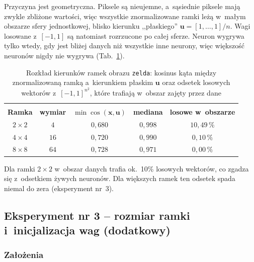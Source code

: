\documentclass[12pt]{article}
\begin{document}
Przyczyna jest geometryczna. Piksele są nieujemne, a~sąsiednie piksele mają zwykle zbliżone wartości,
więc wszystkie znormalizowane ramki leżą w~małym obszarze sfery jednostkowej, blisko kierunku
,,płaskiego'' $\mathbf{u}=[1,\dots,1]/n$. Wagi losowane z~$[-1,1]$ są natomiast rozrzucone po całej
sferze. Neuron wygrywa tylko wtedy, gdy jest bliżej danych niż wszystkie inne neurony, więc
większość neuronów nigdy nie wygrywa (Tab.~\ref{tab_geo}).

\begin{table}[h!]
 \caption{Rozkład kierunków ramek obrazu \texttt{zelda}: kosinus kąta między znormalizowaną ramką
 a~kierunkiem płaskim $\mathbf{u}$ oraz odsetek losowych wektorów z~$[-1,1]^{n^2}$, które trafiają
 w~obszar zajęty przez dane}
 \centering
 \small
 \vspace{0.2cm}
 \begin{tabular}{c c c c c}
  \hline\hline\\[-0.4cm]
  \textbf{Ramka} & \textbf{wymiar} & $\min\cos(\mathbf{x},\mathbf{u})$ & \textbf{mediana} & \textbf{losowe w~obszarze}\\[0.1cm]
  \hline
  $2\times2$ & $4$ & $0{,}680$ & $0{,}998$ & $10{,}49\,\%$ \\
  $4\times4$ & $16$ & $0{,}720$ & $0{,}990$ & $0{,}10\,\%$ \\
  $8\times8$ & $64$ & $0{,}728$ & $0{,}971$ & $0{,}00\,\%$ \\
  \hline
 \end{tabular}
 \label{tab_geo}
\end{table}

\noindent Dla ramki $2\times2$ w~obszar danych trafia ok.\ 10\% losowych wektorów, co zgadza się
z~odsetkiem żywych neuronów. Dla większych ramek ten odsetek spada niemal do zera (eksperyment nr~3).


\subsection{Eksperyment nr 3 -- rozmiar ramki i~inicjalizacja wag (dodatkowy)}

\subsubsection{Założenia}
\end{document}
